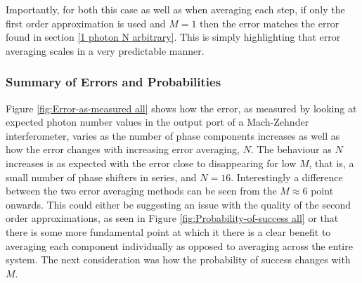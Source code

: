 \documentclass[aps,pra,twocolumn,superscriptaddress,numerical]{revtex4-1}
\begin{document}
		Importantly, for both this case as well as when averaging each step, if only the first order approximation is used and $M=1$ then the error matches the error found in section \ref{1 photon N arbitrary}. This is simply highlighting that error averaging scales in a very predictable manner.
		
		
		\subsubsection{Summary of Errors and Probabilities\label{Summary of Errors and Probabilities}}
		
		Figure \ref{fig:Error-as-measured all} shows how the error, as measured by looking at expected photon number values in the output port of a Mach-Zehnder interferometer, varies as the number of phase components increases as well as how the error changes with increasing error averaging, $N$. The behaviour as $N$ increases is as expected with the error close to disappearing for low $M$, that is, a small number of phase shifters in series, and $N=16$. Interestingly a difference between the two error averaging methods can be seen from the $M\approx6$ point onwards. This could either be suggesting an issue with the quality of the second order approximations, as seen in Figure \ref{fig:Probability-of-success all}	or that there is some more fundamental point at which it there is a clear benefit to averaging each component individually as opposed to averaging across the entire system. The next consideration was how the probability of success changes with $M$.
		
\end{document}
